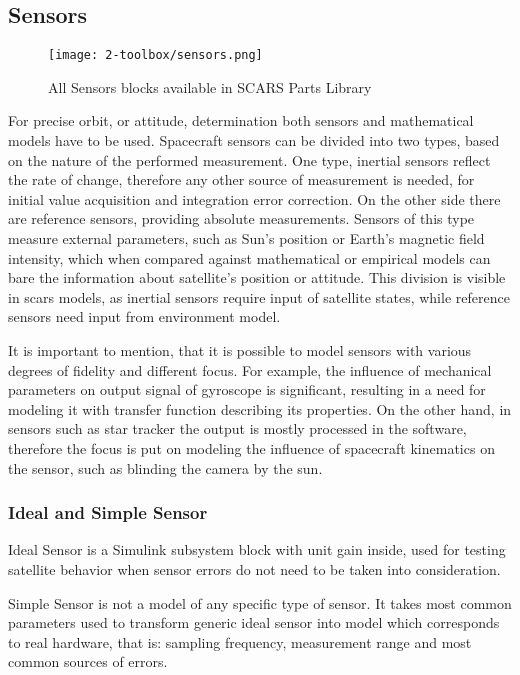 \subsection{Sensors}\label{sec:sensors}
    \begin{figure}[H]
        \centering
        \texttt{[image: 2-toolbox/sensors.png]}
        \caption{All Sensors blocks available in SCARS Parts Library}
        \label{fig:sensors}
    \end{figure}

    For precise orbit, or attitude, determination both sensors and mathematical models have to be used. Spacecraft sensors can be divided into two types, based on the nature of the performed measurement. One type, inertial sensors reflect the rate of change, therefore any other source of measurement is needed, for initial value acquisition and integration error correction. On the other side there are reference sensors, providing absolute measurements. Sensors of this type measure external parameters, such as Sun's position or Earth's magnetic field intensity, which when compared against mathematical or empirical models can bare the information about satellite's position or attitude. This division is visible in \ac{scars} models, as inertial sensors require input of satellite states, while reference sensors need input from environment model.

    It is important to mention, that it is possible to model sensors with various degrees of fidelity and different focus. For example, the influence of mechanical parameters on output signal of gyroscope is significant, resulting in a need for modeling it with transfer function describing its properties. On the other hand, in sensors such as star tracker the output is mostly processed in the software, therefore the focus is put on modeling the influence of spacecraft kinematics on the sensor, such as blinding the camera by the sun.

    \subsubsection{Ideal and Simple Sensor}
        Ideal Sensor is a Simulink subsystem block with unit gain inside, used for testing satellite behavior when sensor errors do not need to be taken into consideration.

        Simple Sensor is not a model of any specific type of sensor. It takes most common parameters used to transform generic ideal sensor into model which corresponds to real hardware, that is: sampling frequency, measurement range and most common sources of errors.

